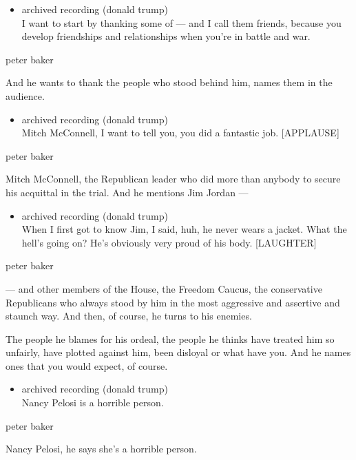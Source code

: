 \begin{itemize}
\tightlist
\item
  archived recording (donald trump)\\
  I want to start by thanking some of --- and I call them friends,
  because you develop friendships and relationships when you're in
  battle and war.
\end{itemize}

peter baker

And he wants to thank the people who stood behind him, names them in the
audience.

\begin{itemize}
\tightlist
\item
  archived recording (donald trump)\\
  Mitch McConnell, I want to tell you, you did a fantastic job.
  {[}APPLAUSE{]}
\end{itemize}

peter baker

Mitch McConnell, the Republican leader who did more than anybody to
secure his acquittal in the trial. And he mentions Jim Jordan ---

\begin{itemize}
\tightlist
\item
  archived recording (donald trump)\\
  When I first got to know Jim, I said, huh, he never wears a jacket.
  What the hell's going on? He's obviously very proud of his body.
  {[}LAUGHTER{]}
\end{itemize}

peter baker

--- and other members of the House, the Freedom Caucus, the conservative
Republicans who always stood by him in the most aggressive and assertive
and staunch way. And then, of course, he turns to his enemies.

The people he blames for his ordeal, the people he thinks have treated
him so unfairly, have plotted against him, been disloyal or what have
you. And he names ones that you would expect, of course.

\begin{itemize}
\tightlist
\item
  archived recording (donald trump)\\
  Nancy Pelosi is a horrible person.
\end{itemize}

peter baker

Nancy Pelosi, he says she's a horrible person.

